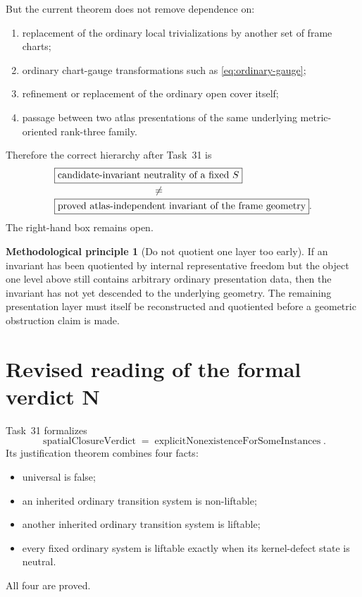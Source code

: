 \documentclass[11pt,a4paper]{article}
\theoremstyle{definition}
\newtheorem{principle}{Methodological principle}
\newcommand{\code}[1]{\path{#1}}
\begin{document}
But the current theorem does not remove dependence on:
\begin{enumerate}[leftmargin=*,label=\alph*)]
 \item replacement of the ordinary local trivializations by another set of frame charts;
 \item ordinary chart-gauge transformations such as \cref{eq:ordinary-gauge};
 \item refinement or replacement of the ordinary open cover itself;
 \item passage between two atlas presentations of the same underlying metric-oriented rank-three family.
\end{enumerate}

Therefore the correct hierarchy after Task~31 is
\begin{equation}\label{eq:hierarchy}
\begin{aligned}
 &\boxed{\text{candidate-invariant neutrality of a fixed }S}\\[-0.2em]
 &\hspace{35mm}\neq\\[-0.2em]
 &\boxed{\text{proved atlas-independent invariant of the frame geometry}}.
\end{aligned}
\end{equation}
The right-hand box remains open.

\begin{principle}[Do not quotient one layer too early]
If an invariant has been quotiented by internal representative freedom but the object one level above still contains arbitrary ordinary presentation data, then the invariant has not yet descended to the underlying geometry.  The remaining presentation layer must itself be reconstructed and quotiented before a geometric obstruction claim is made.
\end{principle}

\section{Revised reading of the formal verdict N}\label{sec:verdict}

Task~31 formalizes
\[
 \operatorname{spatialClosureVerdict}
 =\operatorname{explicitNonexistenceForSomeInstances}.
\]
Its justification theorem combines four facts:
\begin{itemize}[leftmargin=*]
 \item universal \code{OrdinaryInternalLiftable} is false;
 \item an inherited ordinary transition system is non-liftable;
 \item another inherited ordinary transition system is liftable;
 \item every fixed ordinary system is liftable exactly when its kernel-defect state is neutral.
\end{itemize}
All four are proved.
\end{document}
